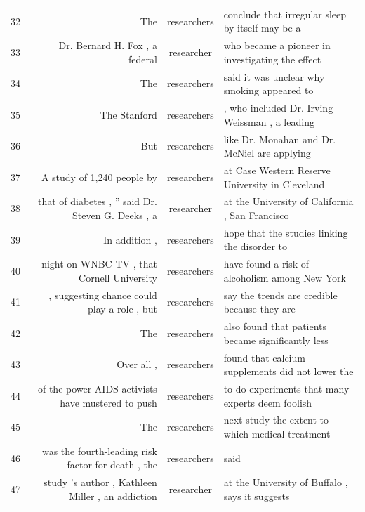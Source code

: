 {\begin{table}
\begin{tabular}{|lrcl|}
32 & The                                                & researchers & conclude that irregular sleep by itself may be a   \\
33 & Dr. Bernard H. Fox , a federal                     & researcher  & who became a pioneer in investigating the effect   \\
34 & The                                                & researchers & said it was unclear why smoking appeared to        \\
35 & The Stanford                                       & researchers & , who included Dr. Irving Weissman , a leading     \\
36 & But                                                & researchers & like Dr. Monahan and Dr. McNiel are applying       \\
37 & A study of 1,240 people by                         & researchers & at Case Western Reserve University in Cleveland    \\
38 & that of diabetes , '' said Dr. Steven G. Deeks , a & researcher  & at the University of California , San Francisco    \\
39 & In addition ,                                      & researchers & hope that the studies linking the disorder to      \\
40 & night on WNBC-TV , that Cornell University         & researchers & have found a risk of alcoholism among New York     \\
41 & , suggesting chance could play a role , but        & researchers & say the trends are credible because they are       \\
42 & The                                                & researchers & also found that patients became significantly less \\
43 & Over all ,                                         & researchers & found that calcium supplements did not lower the   \\
44 & of the power AIDS activists have mustered to push  & researchers & to do experiments that many experts deem foolish   \\
45 & The                                                & researchers & next study the extent to which medical treatment   \\
46 & was the fourth-leading risk factor for death , the & researchers & said                                               \\
47 & study 's author , Kathleen Miller , an addiction   & researcher  & at the University of Buffalo , says it suggests    \\

\end{tabular}
\end{table}}

